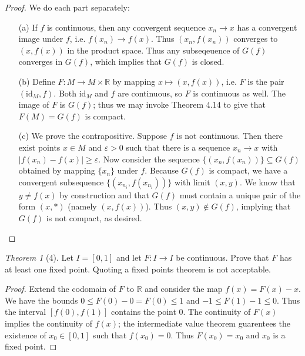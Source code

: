 \documentclass[12pt]{article}
\theoremstyle{remark}
\theoremstyle{named}
\newtheorem*{theorem}{Theorem}
\newcommand{\e}{\varepsilon}
\newcommand{\R}{\mathbb R}
\newcommand{\id}[1]{\text{id}_{#1}}
\begin{document}
\begin{proof}
    We do each part separately:
    \begin{enumerate}
        \item[(a)] If \(f\) is continuous, then any convergent sequence \(x_n \to x\) has a convergent image under \(f\), i.e. \(f(x_n) \to f(x)\). Thus \((x_n, f(x_n))\) converges to \((x, f(x))\) in the product space. Thus any subseqeuence of \(G(f)\) converges in \(G(f)\), which implies that \(G(f)\) is closed.
        \item[(b)] Define \(F : M \to M \times \R\) by mapping \(x \mapsto (x, f(x))\), i.e. \(F\) is the pair \((\id{M}, f)\). Both \(\id{M}\) and \(f\) are continuous, so \(F\) is continuous as well. The image of \(F\) is \(G(f)\); thus we may invoke Theorem 4.14 to give that \(F(M) = G(f)\) is compact.
        \item[(c)] We prove the contrapositive. Suppose \(f\) is not continuous. Then there exist points \(x \in M\) and \(\e > 0\) such that there is a sequence \(x_n \to x\) with \(|f(x_n) - f(x)| \ge \e\). Now consider the sequence \(\{(x_n, f(x_n))\} \subseteq G(f)\) obtained by mapping \(\{x_n\}\) under \(f\). Because \(G(f)\) is compact, we have a convergent subsequence \(\{(x_{n_i}, f(x_{n_i}))\}\) with limit \((x, y)\). We know that \(y \neq f(x)\) by construction and that \(G(f)\) must contain a unique pair of the form \((x, *)\) (namely \((x, f(x))\)). Thus \((x, y) \notin G(f)\), implying that \(G(f)\) is not compact, as desired.
    \end{enumerate}    
\end{proof}

\begin{theorem}[4]
    Let \(I = [0, 1]\) and let \(F : I \to I\) be continuous. Prove that \(F\) has at least one fixed point. Quoting a fixed points theorem is not acceptable.
\end{theorem}

\begin{proof}
    Extend the codomain of \(F\) to \(\R\) and consider the map \(f(x) = F(x) - x\). We have the bounds \(0 \le F(0) - 0 = F(0) \le 1\) and \(-1 \le F(1) - 1 \le 0\). Thus the interval \([f(0), f(1)]\) contains the point \(0\). The continuity of \(F(x)\)implies the continuity of \(f(x)\); the intermediate value theorem guarentees the existence of \(x_0 \in [0, 1]\) such that \(f(x_0) = 0\). Thus \(F(x_0) = x_0\) and \(x_0\) is a fixed point. 
\end{proof}
\end{document}
